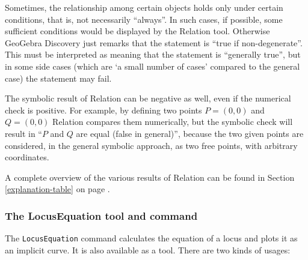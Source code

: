 \documentclass{article}
\begin{document}
Sometimes, the relationship among certain objects holds only under certain conditions, that is, not necessarily ``always''. In such cases, if possible, some sufficient conditions would be displayed by the Relation tool. Otherwise GeoGebra Discovery just remarks that the statement is ``true if non-degenerate''. This must be interpreted as meaning that the statement is ``generally true'', but in some side cases (which are `a small number of cases' compared to the general case) the statement may fail.

The symbolic result of Relation can be negative as well, even if the numerical check is positive. For example, by defining two points $P=(0,0)$ and $Q=(0,0)$ Relation compares them numerically, but the symbolic check will result in ``$P$ and $Q$ are equal (false in general)'', because the two given points are considered, in the general symbolic approach, as two free points, with arbitrary coordinates.

A complete overview of the various results of Relation can be found in Section \ref{explanation-table} on page \pageref{explanation-table}.

\subsubsection{The LocusEquation tool and command}

The \texttt{LocusEquation} command calculates the equation of a locus and plots it as an implicit curve.
It is also available as a tool. There are two kinds of usages:
\end{document}
